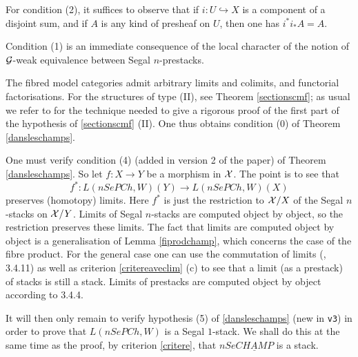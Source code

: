 For condition (2),
it suffices to observe that if
$i: U\hookrightarrow X$ is a component
of a disjoint sum, and if $A$ is any kind of presheaf on
$U$, then one has
$i^{\ast}i_{\ast}A=A$.

Condition (1) is an
immediate consequence of the local character of the
notion of ${\cal G}$-weak equivalence between Segal $n$-prestacks.

The
fibred model categories admit arbitrary limits and colimits, and
functorial factorisations. For the structures of type (II), see
Theorem
\ref{sectionscmf}; as usual we refer to \cite{Jardine} for the
technique needed
to give a rigorous proof of the first part of
the hypothesis of \ref{sectionscmf}
(II). One thus obtains condition (0) of Theorem \ref{dansleschamps}.


One must verify condition (4)
(added in version 2 of the paper) of Theorem \ref{dansleschamps}.
So let $f:X\rightarrow
Y$ be a morphism in ${\cal X}$. The point is to see that
$$
f^{\ast} :L(nSePCh , W)(Y) \rightarrow L(nSePCh , W) (X)
$$
preserves (homotopy) limits. Here $f^{\ast}$ is just the restriction
to ${\cal X} /X$ of the Segal $n$-stacks on ${\cal X} /Y$. Limits of
Segal $n$-stacks are computed object by object, so the restriction preserves
these limits. The fact that limits are computed object by object
is a generalisation of Lemma \ref{fiprodchamp}, which concerns the case of the fibre
product. For the general case one can use the commutation of limits
(\cite{Vogt2}, \cite{limits} 3.4.11) as well as criterion \ref{critereaveclim} (c) to see that a
limit (as a prestack)
of stacks is still a stack. Limits of prestacks are computed
object by object according to \cite{limits} 3.4.4.



It will then only remain to verify hypothesis (5) of
\ref{dansleschamps} (new in {\tt v3})
in order to prove that $L(nSePCh, W)$
is a Segal $1$-stack. We shall do this at the same time as the proof, by
criterion \ref{critere}, that $nSe\underline{CHAMP}$ is a stack.

